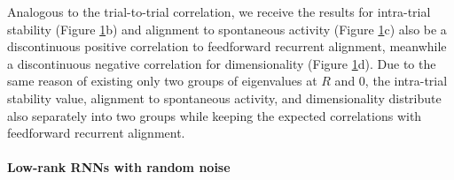 \documentclass[11pt]{article}
\begin{document}
\begin{figure}[H]
			\label{fig:ttc_its_low_rank_sym_no_noise}
		\end{figure}
	
	\newpage
	Analogous to the trial-to-trial correlation, we receive the results for intra-trial stability (Figure \ref{fig:ttc_its_low_rank_sym_no_noise}b) and alignment to spontaneous activity (Figure \ref{fig:ttc_its_low_rank_sym_no_noise}c) also be a discontinuous positive correlation to feedforward recurrent alignment, meanwhile a discontinuous negative correlation for dimensionality (Figure \ref{fig:ttc_its_low_rank_sym_no_noise}d). Due to the same reason of existing only two groups of eigenvalues at $R$ and $0$, the intra-trial stability value, alignment to spontaneous activity, and dimensionality distribute also separately into two groups while keeping the expected correlations with feedforward recurrent alignment.
	
	
	\vspace{0.5cm}
	\paragraph{Low-rank RNNs with random noise}
		
\end{document}
